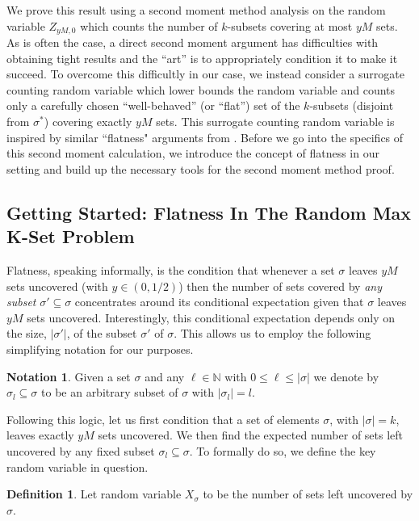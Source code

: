 \documentclass[12pt,reqno]{amsart}
\numberwithin{equation}{section}
\theoremstyle{definition}
\newtheorem{definition}[theorem]{Definition}
\newtheorem*{notation}{Notation}
\renewcommand{\[}{\begin{equation}}
\renewcommand{\]}{\end{equation}}
\renewcommand{\|}{\bigg{|}}
\begin{document}
We prove this result using a second moment method analysis on the random variable $Z_{yM,0}$ which counts the number of $k$-subsets covering at most $yM$ sets. As is often the case, a direct second moment argument has difficulties with obtaining tight results and the ``art'' is to appropriately condition it to make it succeed. To overcome this difficultly in our case, we instead consider a surrogate counting random variable which lower bounds the random variable and counts only a carefully chosen ``well-behaved'' (or ``flat'') set of the $k$-subsets (disjoint from $\sigma^*$) covering exactly $yM$ sets. This surrogate counting random variable is inspired by similar ``flatness" arguments from \cite{balister2018dense,gamarnik2024overlap}. Before we go into the specifics of this second moment calculation, we introduce the concept of flatness in our setting and build up the necessary tools for the second moment method proof. 

\subsection{Getting Started: Flatness In The Random Max K-Set Problem}

Flatness, speaking informally, is the condition that whenever a set $\sigma$ leaves $yM$ sets uncovered (with $y \in (0,1/2)$) then the number of sets covered by \emph{any subset} $\sigma' \subseteq \sigma$ concentrates around its conditional expectation given that $\sigma$ leaves $yM$ sets uncovered. Interestingly, this conditional expectation depends only on the size, $|\sigma'|$, of the subset $\sigma'$ of $\sigma$. This allows us to employ the following simplifying notation for our purposes.
\begin{notation}\label{not:sigmal}
   Given a set $\sigma$ and any $\ell \in \mathbb{N}$ with $0 \leq \ell \leq |\sigma|$ we denote by $\sigma_l \subseteq \sigma$ to be an arbitrary subset of $\sigma$ with $|\sigma_l| = l$. 
\end{notation}
Following this logic, let us first condition that a set of elements $\sigma$, with $|\sigma| = k$, leaves exactly $y M$ sets uncovered. We then find the expected number of sets left uncovered by any fixed subset $\sigma_l \subseteq \sigma$. To formally do so, we define the key random variable in question. 
\begin{definition}\label{def:Xsigma}
    Let random variable $X_\sigma$ to be the number of sets left uncovered by $\sigma$.
\end{definition}
\end{document}
